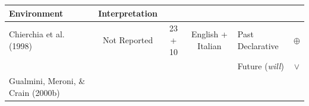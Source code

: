 \documentclass[oneside]{report}
\theoremstyle{definition}
\theoremstyle{definition}
\theoremstyle{definition}
\theoremstyle{remark}
\begin{document}
\begin{longtable}[]{@{}lccclc@{}}
\begin{minipage}[b]{0.25\columnwidth}
Environment\strut
\end{minipage} & \begin{minipage}[b]{0.13\columnwidth}\centering\strut
Interpretation\strut
\end{minipage}\tabularnewline
\midrule
\endhead
\begin{minipage}[t]{0.23\columnwidth}\raggedright\strut
Chierchia et al. (1998)\strut
\end{minipage} & \begin{minipage}[t]{0.07\columnwidth}\centering\strut
Not Reported\strut
\end{minipage} & \begin{minipage}[t]{0.05\columnwidth}\centering\strut
23 + 10\strut
\end{minipage} & \begin{minipage}[t]{0.10\columnwidth}\centering\strut
English + Italian\strut
\end{minipage} & \begin{minipage}[t]{0.25\columnwidth}\raggedright\strut
Past Declarative\strut
\end{minipage} & \begin{minipage}[t]{0.13\columnwidth}\centering\strut
\(\oplus\)\strut
\end{minipage}\tabularnewline
\begin{minipage}[t]{0.23\columnwidth}\raggedright\strut
\strut
\end{minipage} & \begin{minipage}[t]{0.07\columnwidth}\centering\strut
\strut
\end{minipage} & \begin{minipage}[t]{0.05\columnwidth}\centering\strut
\strut
\end{minipage} & \begin{minipage}[t]{0.10\columnwidth}\centering\strut
\strut
\end{minipage} & \begin{minipage}[t]{0.25\columnwidth}\raggedright\strut
Future (\emph{will})\strut
\end{minipage} & \begin{minipage}[t]{0.13\columnwidth}\centering\strut
\(\lor\)\strut
\end{minipage}\tabularnewline
\begin{minipage}[t]{0.23\columnwidth}\raggedright\strut
Gualmini, Meroni, \& Crain (2000b)\strut
\end{minipage} & \begin{minipage}[t]{0.07\columnwidth}\centering\strut

\end{minipage}
\end{longtable}
\end{document}
